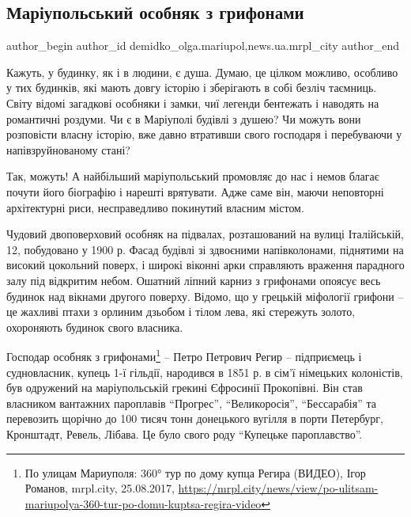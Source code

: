  
 
 
 
 
 
\subsection{Маріупольський особняк з грифонами}
\label{sec:28_08_2017.stz.news.ua.mrpl_city.1.mariupol_osobnjak_z_grifonami}
 
\ifcmt
 author_begin
   author_id demidko_olga.mariupol,news.ua.mrpl_city
 author_end
\fi

Кажуть, у будинку, як і в людини, є душа. Думаю, це цілком можливо, особливо у
тих будинків, які мають довгу історію і зберігають в собі безліч таємниць.
Світу відомі загадкові особняки і замки, чиї легенди бентежать і наводять на
романтичні роздуми. Чи є в Маріуполі будівлі з душею? Чи можуть вони розповісти
власну історію, вже давно втративши свого господаря і перебуваючи у
напівзруйнованому стані?


Так, можуть! А найбільший маріупольський промовляє до нас і немов благає почути
його біографію і нарешті врятувати. Адже саме він, маючи неповторні
архітектурні риси, несправедливо покинутий власним містом.

Чудовий двоповерховий особняк на підвалах, розташований на вулиці Італійській,
12, побудовано у 1900 р. Фасад будівлі зі здвоєними напівколонами, піднятими на
високий цокольний поверх, і широкі віконні арки справляють враження парадного
залу під відкритим небом. Ошатний ліпний карниз з грифонами опоясує весь
будинок над вікнами другого поверху. Відомо, що у грецькій міфології грифони –
це жахливі птахи з орлиним дзьобом і тілом лева, які стережуть золото,
охороняють будинок свого власника.


Господар особняк з
грифонами\footnote{По улицам Мариуполя: 360° тур по дому купца Регира (ВИДЕО), Ігор Романов, mrpl.city, 25.08.2017, \url{https://mrpl.city/news/view/po-ulitsam-mariupolya-360-tur-po-domu-kuptsa-regira-video}}
– Петро Петрович Регир – підприємець і судновласник, купець 1-ї гільдії,
народився в 1851 р. в сім'ї німецьких колоністів, був одружений на
маріупольській грекині Єфросинії Прокопівні. Він став власником вантажних
пароплавів \enquote{Прогрес}, \enquote{Великоросія}, \enquote{Бессарабія} та
перевозить щорічно до 100 тисяч тонн донецького вугілля в порти Петербург,
Кронштадт, Ревель, Лібава. Це було свого роду \enquote{Купецьке пароплавство}.

